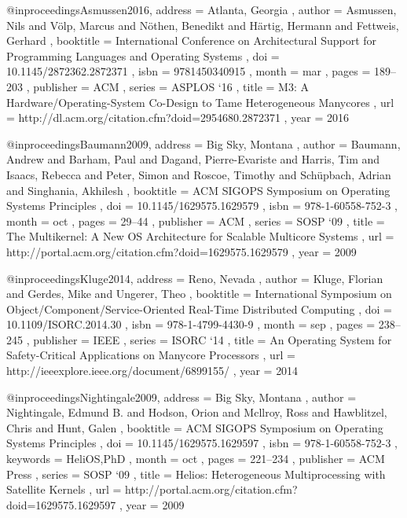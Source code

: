 @inproceedings{Asmussen2016,
	address   = { Atlanta, Georgia },
	author    = { Asmussen, Nils and
	              V{\"{o}}lp, Marcus and
	              N{\"{o}}then, Benedikt and
				  H{\"{a}}rtig, Hermann and
				  Fettweis, Gerhard
	},
	booktitle = { International Conference on Architectural Support for
	              Programming Languages and Operating Systems
	},
	doi       = { 10.1145/2872362.2872371 },
	isbn      = { 9781450340915 },
	month     = { mar },
	pages     = { 189--203 },
	publisher = { ACM },
	series    = { ASPLOS `16 },
	title     = { M3: A Hardware/Operating-System Co-Design to Tame Heterogeneous Manycores },
	url       = { http://dl.acm.org/citation.cfm?doid=2954680.2872371 },
	year      = { 2016 }
}

@inproceedings{Baumann2009,
	address   = { Big Sky, Montana },
	author    = { Baumann, Andrew and
	              Barham, Paul and
				  Dagand, Pierre-Evariste and
				  Harris, Tim and
				  Isaacs, Rebecca and
				  Peter, Simon and
				  Roscoe, Timothy and
				  Sch{\"{u}}pbach, Adrian and
				  Singhania, Akhilesh
	},
	booktitle = { ACM SIGOPS Symposium on Operating Systems Principles },
	doi       = { 10.1145/1629575.1629579 },
	isbn      = { 978-1-60558-752-3 },
	month     = { oct },
	pages     = { 29--44 },
	publisher = { ACM },
	series    = { SOSP `09 },
	title     = { The Multikernel: A New OS Architecture for Scalable Multicore Systems },
	url       = { http://portal.acm.org/citation.cfm?doid=1629575.1629579 },
	year      = { 2009 }
}

@inproceedings{Kluge2014,
    address   = { Reno, Nevada },
    author    = { Kluge, Florian and
                 Gerdes, Mike and
                 Ungerer, Theo
    },
    booktitle = { International Symposium on Object/Component/Service-Oriented
                  Real-Time Distributed Computing
    },
    doi       = { 10.1109/ISORC.2014.30 },
    isbn      = { 978-1-4799-4430-9 },
    month     = { sep },
    pages     = { 238--245 },
    publisher = { IEEE },
    series    = { ISORC `14 },
    title     = { An Operating System for Safety-Critical Applications on Manycore Processors },
    url       = { http://ieeexplore.ieee.org/document/6899155/ },
    year      = { 2014 }
}

@inproceedings{Nightingale2009,
    address   = { Big Sky, Montana },
    author    = { Nightingale, Edmund B. and
                  Hodson, Orion and
                  Mcllroy, Ross and
                  Hawblitzel, Chris and
                  Hunt, Galen
    },
    booktitle = { ACM SIGOPS Symposium on Operating Systems Principles },
    doi       = { 10.1145/1629575.1629597 },
    isbn      = { 978-1-60558-752-3 },
    keywords  = { HeliOS,PhD },
    month     = { oct },
    pages     = { 221--234 },
    publisher = { ACM Press },
    series    = { SOSP `09 },
    title     = { Helios: Heterogeneous Multiprocessing with Satellite Kernels },
    url       = { http://portal.acm.org/citation.cfm?doid=1629575.1629597 },
    year      = { 2009 }
}

